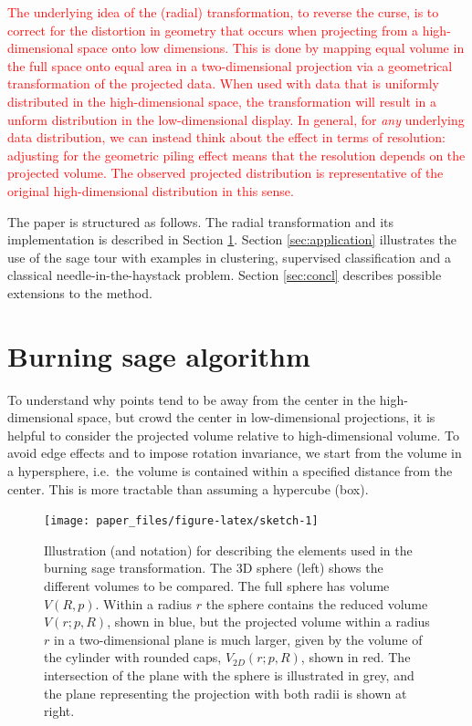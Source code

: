 \documentclass[]{interact}
\theoremstyle{plain}%
\theoremstyle{definition}
\theoremstyle{remark}
\begin{document}
\textcolor{red}{The underlying idea of the (radial) transformation, to reverse the curse, is to correct for the distortion in geometry that occurs when projecting from a high-dimensional space onto low dimensions. This is done by mapping equal volume in the full space onto equal area in a two-dimensional projection via a geometrical transformation of the projected data. When used with data that is uniformly distributed in the high-dimensional space, the transformation will result in a unform distribution in the low-dimensional display. In general, for \textit{any} underlying data distribution, we can instead think about the effect in terms of resolution: adjusting for the geometric piling effect means that the resolution depends on the projected volume. The observed projected distribution is representative of the original high-dimensional distribution in this sense.}

The paper is structured as follows. The radial transformation and its
implementation is described in Section \ref{sec:method}. Section
\ref{sec:application} illustrates the use of the sage tour with examples
in clustering, supervised classification and a classical
needle-in-the-haystack problem. Section \ref{sec:concl} describes
possible extensions to the method.

\hypertarget{sec:method}{%
\section{Burning sage algorithm}\label{sec:method}}

To understand why points tend to be away from the center in the
high-dimensional space, but crowd the center in low-dimensional
projections, it is helpful to consider the projected volume relative to
high-dimensional volume. To avoid edge effects and to impose rotation
invariance, we start from the volume in a hypersphere, i.e.~the volume
is contained within a specified distance from the center. This is more
tractable than assuming a hypercube (box).

\begin{figure}

{\centering \texttt{[image: paper\_files/figure-latex/sketch-1]} 

}

\caption{Illustration (and notation) for describing the elements used in the burning sage transformation. The 3D sphere (left) shows the different volumes to be compared. The full sphere has volume $V(R, p)$. Within a radius $r$ the sphere contains the reduced volume $V(r; p, R)$, shown in blue, but the projected volume within a radius $r$ in a two-dimensional plane is much larger, given by the volume of the cylinder with rounded caps, $V_{2D}(r; p ,R)$, shown in red. The intersection of the plane with the sphere is illustrated in grey, and the plane representing the projection with both radii is shown at right.}\label{fig:sketch}
\end{figure}
\end{document}
